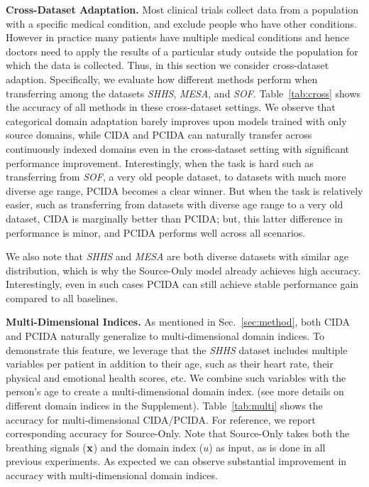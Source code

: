 \documentclass{article}
\newcommand{\tabref}[1]{Table~\ref{#1}}
\newcommand{\secref}[1]{Sec.~\ref{#1}}
\begin{document}
\textbf{Cross-Dataset Adaptation.}
Most clinical trials collect data from a population with a specific medical condition, and exclude people who have other conditions. However in practice many patients have multiple medical conditions and hence doctors need to apply the results of a particular study outside the population for which the data is collected.  Thus, in this section we consider cross-dataset adaption. Specifically, we evaluate how different methods perform when transferring among the datasets \emph{SHHS}, \emph{MESA}, and \emph{SOF}. \tabref{tab:cross} shows the accuracy of all methods in these cross-dataset settings. We observe that categorical domain adaptation barely improves upon models trained with only source domains, while CIDA and PCIDA can naturally transfer across continuously indexed domains even in the cross-dataset setting with significant performance improvement. Interestingly, when the task is hard such as transferring from \emph{SOF}, a very old people dataset, to datasets with much more diverse age range, PCIDA becomes a clear winner. But when the task is relatively easier, such as transferring from datasets with diverse age range to a very old dataset, CIDA is marginally better than PCIDA; but, this latter difference in performance is minor, and PCIDA performs well across all scenarios.

We also note that \emph{SHHS} and \emph{MESA} are both diverse datasets with similar age distribution, which is why the Source-Only model already achieves high accuracy. Interestingly, even in such cases PCIDA can still achieve stable performance gain compared to all baselines.



\textbf{Multi-Dimensional Indices.} As mentioned in \secref{sec:method}, both CIDA and PCIDA naturally generalize to multi-dimensional domain indices. To demonstrate this feature, we leverage that the \emph{SHHS} dataset includes multiple variables per patient in addition to their age, such as their heart rate, their physical and emotional health scores, etc. We combine such variables with the person's age to create a multi-dimensional domain index. (see more details on different domain indices in the Supplement). \tabref{tab:multi} shows the accuracy for multi-dimensional CIDA/PCIDA. For reference, we report corresponding accuracy for Source-Only. Note that Source-Only takes both the breathing signals (${\bf x}$) and the domain index ($u$) as input, as is done in all previous experiments. As expected we can observe substantial improvement in accuracy with multi-dimensional domain indices. 
\end{document}
